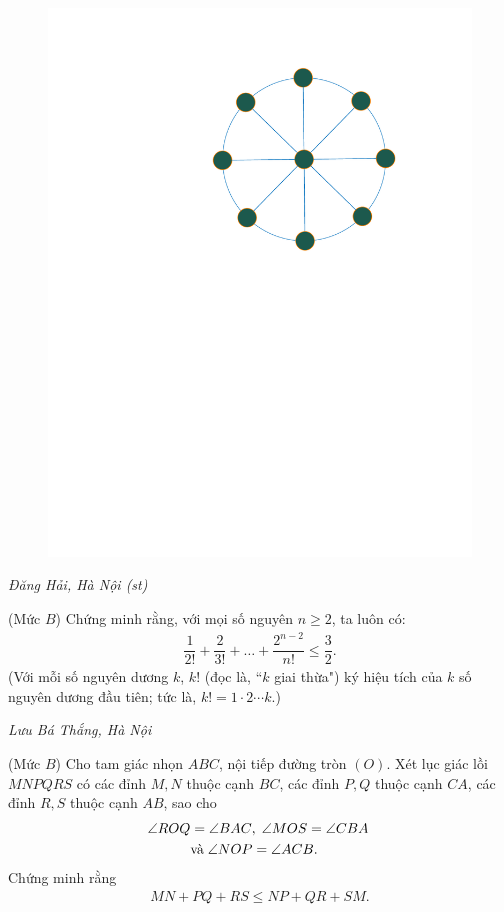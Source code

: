 \begin{multicols}{2}
\begin{figure}[H]
		\includegraphics[width=0.68\linewidth]{P634}
		\vspace*{-5pt}
	\end{figure}
	\begin{flushright}
		\textit{Đăng Hải, Hà Nội (st)}
	\end{flushright}
	{}
	(Mức $B$) Chứng minh rằng, với mọi số nguyên $n\ge2$, ta luôn có:
	\begin{align*}
		\dfrac{1}{2!}+\dfrac{2}{3!}+\ldots+\dfrac{2^{n-2}}{n!}\le\dfrac{3}{2}.
	\end{align*}
	(Với mỗi số nguyên dương $k$, $k!$ (đọc là, ``$k$ giai thừa") ký hiệu tích của $k$ số nguyên dương đầu tiên; tức là, $k!=1\cdot2\cdots k$.)
	\begin{flushright}
		\textit{Lưu Bá Thắng, Hà Nội}
	\end{flushright}
	{}
	(Mức $B$) Cho tam giác nhọn $ABC$, nội tiếp đường tròn $(O)$. Xét lục giác lồi $MNPQRS$ có các đỉnh $M, N$ thuộc cạnh $BC$, các đỉnh $P, Q$ thuộc cạnh $CA$, các đỉnh $R, S$ thuộc cạnh $AB$, sao cho
	\begin{align*}
		\angle{ROQ} &=\angle{BAC},\; \angle{MOS} =\angle{CBA}\;\\
		&\text{\color{black}và}\;\angle{NOP }= \angle{ACB}.
	\end{align*}
	Chứng minh rằng 
	\begin{align*}
		MN + PQ + RS \leq NP + QR + SM.

\end{align*}
\end{multicols}
